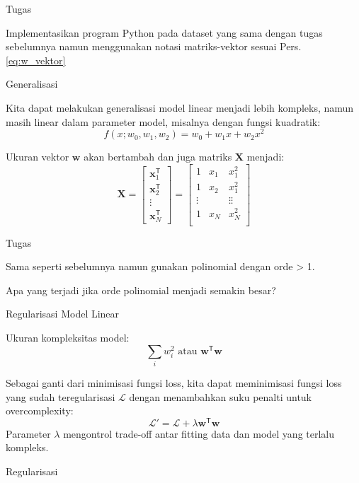 \documentclass[a4paper,12pt]{article} %
\begin{document}
Tugas

Implementasikan program Python pada dataset yang sama dengan tugas sebelumnya
namun menggunakan notasi matriks-vektor sesuai Pers. \ref{eq:w_vektor}

Generalisasi

Kita dapat melakukan generalisasi model linear menjadi lebih kompleks, namun
masih linear dalam parameter model, misalnya dengan fungsi kuadratik:
\begin{equation}
f(x; w_{0}, w_{1}, w_{2}) = w_{0} +w_{1}x + w_{2}x^{2}
\end{equation}

Ukuran vektor $\mathbf{w}$ akan bertambah dan juga matriks $\mathbf{X}$ menjadi:
$$
\mathbf{X} = \begin{bmatrix}
\mathbf{x}^{\mathsf{T}}_{1} \\
\mathbf{x}^{\mathsf{T}}_{2} \\
\vdots \\
\mathbf{x}^{\mathsf{T}}_{N}
\end{bmatrix} =
\begin{bmatrix}
1 & x_{1} & x_{1}^{2} \\
1 & x_{2} & x_{1}^{2} \\
\vdots & & \vdots \vdots \\
1 & x_{N} & x_{N}^{2} \\
\end{bmatrix}
$$


Tugas

Sama seperti sebelumnya namun gunakan polinomial dengan orde > 1.

Apa yang terjadi jika orde polinomial menjadi semakin besar?


Regularisasi Model Linear

Ukuran kompleksitas model:
\begin{equation}
\sum_{i} w_{i}^{2}\,\,\text{atau }\mathbf{w}^{\mathsf{T}}\mathbf{w}
\end{equation}

Sebagai ganti dari minimisasi fungsi loss, kita dapat meminimisasi fungsi loss yang
sudah teregularisasi $\mathcal{L}$ dengan menambahkan suku penalti untuk overcomplexity:
\begin{equation}
\mathcal{L}' = \mathcal{L} + \lambda \mathbf{w}^{\mathsf{T}} \mathbf{w}
\end{equation}
Parameter $\lambda$ mengontrol trade-off antar fitting data dan model yang terlalu
kompleks.

Regularisasi
\end{document}
